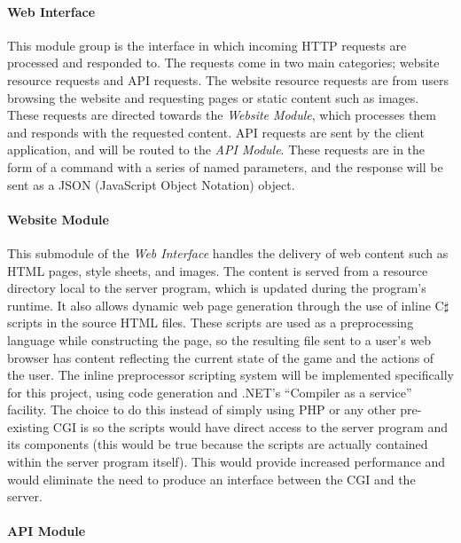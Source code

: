 \paragraph{Web Interface}
This module group is the interface in which incoming HTTP requests are processed and responded to. The requests come in two main categories; website resource requests and API requests. The website resource requests are from users browsing the website and requesting pages or static content such as images. These requests are directed towards the \emph{Website Module}, which processes them and responds with the requested content. API requests are sent by the client application, and will be routed to the \emph{API Module}. These requests are in the form of a command with a series of named parameters, and the response will be sent as a JSON (JavaScript Object Notation) object.

\paragraph{Website Module}
This submodule of the \emph{Web Interface} handles the delivery of web content such as HTML pages, style sheets, and images. The content is served from a resource directory local to the server program, which is updated during the program's runtime. It also allows dynamic web page generation through the use of inline C$\sharp$ scripts in the source HTML files. These scripts are used as a preprocessing language while constructing the page, so the resulting file sent to a user's web browser has content reflecting the current state of the game and the actions of the user. The inline preprocessor scripting system will be implemented specifically for this project, using code generation and .NET's ``Compiler as a service'' facility. The choice to do this instead of simply using PHP or any other pre-existing CGI is so the scripts would have direct access to the server program and its components (this would be true because the scripts are actually contained within the server program itself). This would provide increased performance and would eliminate the need to produce an interface between the CGI and the server.

\paragraph{API Module}
